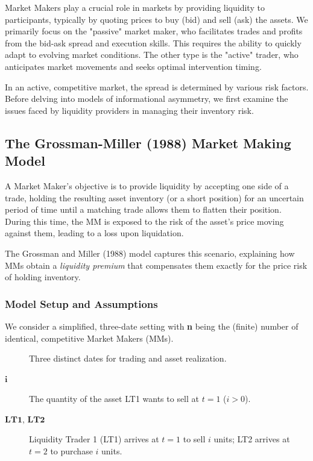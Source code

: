 Market Makers play a crucial role in markets by providing liquidity to participants, typically by quoting prices to buy (bid) and sell (ask) the assets. We primarily focus on the "passive" market maker, who facilitates trades and profits from the bid-ask spread and execution skills. This requires the ability to quickly adapt to evolving market conditions. The other type is the "active" trader, who anticipates market movements and seeks optimal intervention timing.

In an active, competitive market, the spread is determined by various risk factors. Before delving into models of informational asymmetry, we first examine the issues faced by liquidity providers in managing their inventory risk.

\subsection{The Grossman-Miller (1988) Market Making Model}
\label{sec:grossman-miller}

A Market Maker's objective is to provide liquidity by accepting one side of a trade, holding the resulting asset inventory (or a short position) for an uncertain period of time until a matching trade allows them to flatten their position. During this time, the MM is exposed to the risk of the asset's price moving against them, leading to a loss upon liquidation.

The Grossman and Miller (1988) model captures this scenario, explaining how MMs obtain a \textit{liquidity premium} that compensates them exactly for the price risk of holding inventory.

\subsubsection{Model Setup and Assumptions}
We consider a simplified, three-date setting with \textbf{n} being the (finite) number of identical, competitive Market Makers (MMs).
\begin{description}
    \item[\textbf{t \in \{1, 2, 3\}] Three distinct dates for trading and asset realization.
    \item[$\textbf{i}$] The quantity of the asset LT1 wants to sell at $t=1$ ($i>0$).
    \item[$\textbf{LT1, LT2}$] Liquidity Trader 1 (LT1) arrives at $t=1$ to sell $i$ units; LT2 arrives at $t=2$ to purchase $i$ units.
\end{description}


